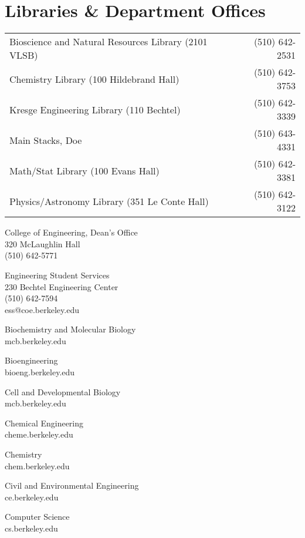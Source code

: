 \chapter*{Libraries \& Department Offices}

\begin{tabular}{lr}
  Bioscience and Natural Resources Library (2101 VLSB) & (510) 642-2531 \\
  Chemistry Library (100 Hildebrand Hall) & (510) 642-3753 \\
  Kresge Engineering Library (110 Bechtel) & (510) 642-3339 \\
  Main Stacks, Doe & (510) 643-4331 \\
  Math/Stat Library (100 Evans Hall) & (510) 642-3381 \\
  Physics/Astronomy Library (351 Le Conte Hall) & (510) 642-3122
\end{tabular}

College of Engineering, Dean’s Office \\
320 McLaughlin Hall \\
(510) 642-5771

Engineering Student Services \\
230 Bechtel Engineering Center \\
(510) 642-7594 \\
{\selectfont ess@coe.berkeley.edu}

Biochemistry and Molecular Biology \\
{\selectfont mcb.berkeley.edu}

Bioengineering \\
{\selectfont bioeng.berkeley.edu}

Cell and Developmental Biology \\
{\selectfont mcb.berkeley.edu}

Chemical Engineering \\
{\selectfont cheme.berkeley.edu}

Chemistry \\
{\selectfont chem.berkeley.edu}

Civil and Environmental Engineering \\
{\selectfont ce.berkeley.edu}

Computer Science \\
{\selectfont cs.berkeley.edu}

